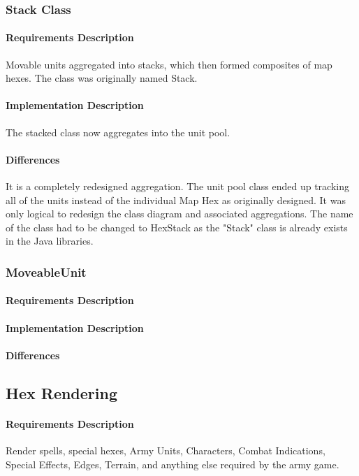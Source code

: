 \documentclass[12pt,a4paper,titlepage]{article}
\begin{document}
\subsubsection{Stack Class} 
\paragraph{Requirements Description} Movable units aggregated into stacks, which then formed composites of map hexes. The class was originally named Stack.
\paragraph{Implementation Description} The stacked class now aggregates into the unit pool.
\paragraph{Differences} It is a completely redesigned aggregation.  The unit pool class ended up tracking all of the units instead of the individual Map Hex as originally designed.  It was only logical to redesign the class diagram and associated aggregations. The name of the class had to be changed to HexStack as the "Stack" class is already exists in the Java libraries.

\subsubsection{MoveableUnit}
\paragraph{Requirements Description} 
\paragraph{Implementation Description}
\paragraph{Differences}

\subsection{Hex Rendering} 
\paragraph{Requirements Description}
Render spells, special hexes, Army Units, Characters, 
Combat Indications, Special Effects, Edges, Terrain, and 
anything else required by the army game.
\end{document}
